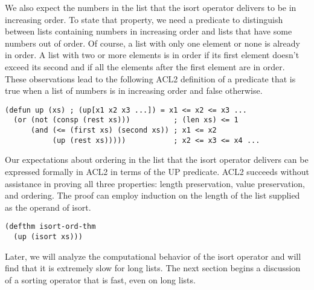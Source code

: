 We also expect the numbers in the list that the isort operator
delivers to be in increasing order.
To state that property, we need a predicate
to distinguish between lists containing numbers in increasing order
and lists that have some numbers out of order.
Of course, a list with only one element or none is already in order.
A list with two or more elements is in order
if its first element doesn't exceed its second and if
all the elements after the first element are in order.
These observations lead to the following
ACL2 definition of a predicate that is true when a list
of numbers is in increasing order and false otherwise.

\label{defun:up}
\begin{Verbatim}
(defun up (xs) ; (up[x1 x2 x3 ...]) = x1 <= x2 <= x3 ...
  (or (not (consp (rest xs)))          ; (len xs) <= 1
      (and (<= (first xs) (second xs)) ; x1 <= x2
           (up (rest xs)))))           ; x2 <= x3 <= x4 ...
\end{Verbatim}

Our expectations about ordering in the list that the isort operator
delivers can be expressed formally in ACL2 in terms of the UP predicate.
ACL2 succeeds without assistance in proving
all three properties: length preservation,
value preservation, and ordering.
The proof can employ induction on the length
of the list supplied as the operand of isort.

\label{defthm:isort-ord-thm}
\begin{Verbatim}
(defthm isort-ord-thm
  (up (isort xs)))
\end{Verbatim}

Later, we will analyze the computational behavior of the isort operator
and will find that it is extremely slow for long lists.
The next section begins a discussion of a sorting operator
that is fast, even on long lists.

